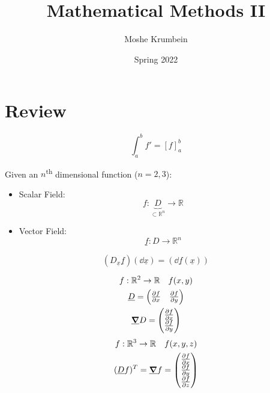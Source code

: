 \documentclass[00_complete]{subfiles}
\title{Mathematical Methods II}
\author{Moshe Krumbein}
\date{Spring 2022}
\begin{document}

\section{Review}
$$\int_{a}^{b}f'=[f]_a^b$$

Given an $n$\textsuperscript{th} dimensional function ($n=2,3$):

\begin{itemize}
    \item Scalar Field:
        $$f: \underbrace{D}_{\subset \mathbb{R}^n} \to \mathbb{R}$$
    \item Vector Field:
        $$\underline f: D \to \mathbb{R}^n$$
\end{itemize}

$$(D_{\underline x}\underline f)(\dd{\underline x})=(\dd{\underline
f(\underline x)})$$

\begin{gather*}
    f: \mathbb{R}^2 \to \mathbb{R} \quad f(x,y) \\
    \underline D = \begin{pmatrix}
        \pdv{f}{x} & \pdv{f}{y}
    \end{pmatrix} \\
    \underline \grad D = \begin{pmatrix}
        \pdv{f}{x} \\ \pdv{f}{y}
    \end{pmatrix}
\end{gather*}
\begin{gather*}
    f: \mathbb{R}^3 \to \mathbb{R} \quad f(x,y,z) \\
    (\underline D f)^T = \underline \grad f = \begin{pmatrix}
        \pdv{f}{x} \\ \pdv{f}{y} \\ \pdv{f}{z}
    \end{pmatrix}
\end{gather*}
\end{document}

